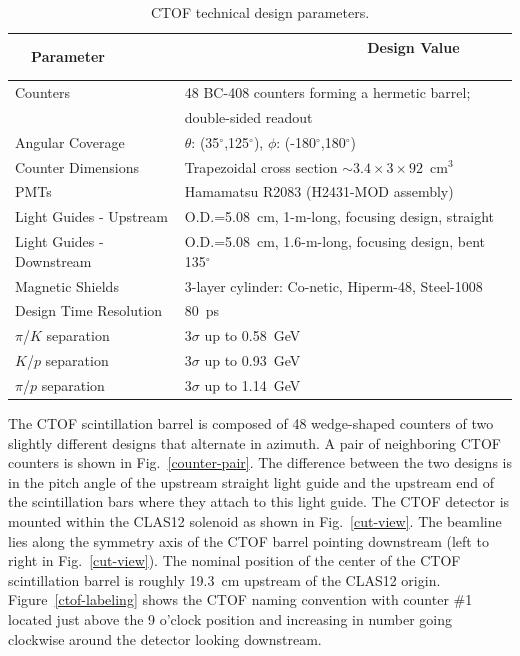\documentclass[12pt]{article}
\begin{document}
\begin{table}[htbp]
\begin{center}
\begin{tabular} {|l|l|} \hline
~~Parameter~~ &~~~~~~~~~~~~~~~~~~~~~~ Design Value ~~~~~~~~~~\\ \hline \hline
Counters           & 48 BC-408 counters forming a hermetic barrel; \\
                          & double-sided readout                   \\ \hline
Angular Coverage          & $\theta$: (35$^\circ$,125$^\circ$), $\phi$: (-180$^\circ$,180$^\circ$) \\ \hline
Counter Dimensions        & Trapezoidal cross section $\sim 3.4 \times 3 \times 92$~cm$^3$ \\ \hline
PMTs                      & Hamamatsu R2083 (H2431-MOD assembly)    \\ \hline
Light Guides - Upstream   & O.D.=5.08~cm, 1-m-long, focusing design, straight \\ \hline
Light Guides - Downstream & O.D.=5.08~cm, 1.6-m-long, focusing design, bent 135$^\circ$ \\ \hline
Magnetic Shields          & 3-layer cylinder: Co-netic, Hiperm-48, Steel-1008 \\ \hline
Design Time Resolution     & 80~ps \\ \hline
$\pi$/$K$ separation      & 3$\sigma$ up to 0.58~GeV \\ \hline
$K$/$p$ separation        & 3$\sigma$ up to 0.93~GeV \\ \hline
$\pi$/$p$ separation      & 3$\sigma$ up to 1.14~GeV \\ \hline
\end{tabular}
\end{center}
\caption{CTOF technical design parameters.}
\label{details}
\end{table}

The CTOF scintillation barrel is composed of 48 wedge-shaped counters of two slightly different designs
that alternate in azimuth. A pair of neighboring CTOF counters is shown in Fig.~\ref{counter-pair}. The
difference between the two designs is in the pitch angle of the upstream straight light guide and the
upstream end of the scintillation bars where they attach to this light guide. The CTOF detector is mounted
within the CLAS12 solenoid as shown in Fig.~\ref{cut-view}. The beamline lies along the symmetry axis of
the CTOF barrel pointing downstream (left to right in Fig.~\ref{cut-view}). The nominal position of the
center of the CTOF scintillation barrel is roughly 19.3~cm upstream of the CLAS12 origin.
Figure~\ref{ctof-labeling} shows the CTOF naming convention with counter \#1 located just above the 9
o'clock position and increasing in number going clockwise around the detector looking downstream.
\end{document}
